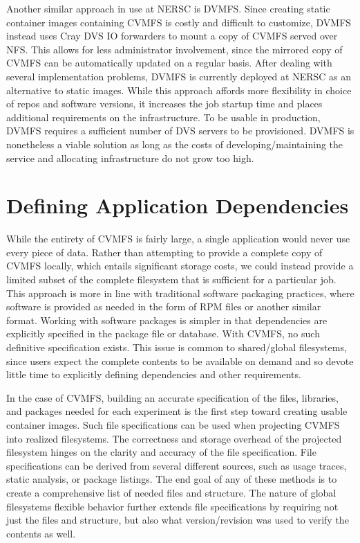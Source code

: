 \documentclass[conference]{IEEEtran}
\begin{document}
Another similar approach in use at NERSC is DVMFS.
Since creating static container images containing CVMFS is costly and difficult to customize,
DVMFS instead uses Cray DVS IO forwarders to mount a copy of CVMFS served over NFS.
This allows for less administrator involvement,
since the mirrored copy of CVMFS can be automatically updated on a regular basis.
After dealing with several implementation problems,
DVMFS is currently deployed at NERSC as an alternative to static images.
While this approach affords more flexibility in choice of repos and software versions,
it increases the job startup time and places additional requirements on the infrastructure.
To be usable in production, DVMFS requires a sufficient number of DVS servers to be provisioned.
DVMFS is nonetheless a viable solution as long as the costs of developing/maintaining the service and allocating infrastructure do not grow too high.

\section{Defining Application Dependencies}

While the entirety of CVMFS is fairly large,
a single application would never use every piece of data.
Rather than attempting to provide a complete copy of CVMFS locally,
which entails significant storage costs,
we could instead provide a limited subset of the complete filesystem that is sufficient for a particular job.
This approach is more in line with traditional software packaging practices,
where software is provided as needed in the form of RPM files or another similar format.
Working with software packages is simpler in that dependencies are explicitly specified in the package file or database.
With CVMFS, no such definitive specification exists.
This issue is common to shared/global filesystems,
since users expect the complete contents to be available on demand and so devote little time to explicitly defining dependencies and other requirements.

In the case of CVMFS,
building an accurate 
specification of the files, libraries, and packages
needed for each experiment is the first step toward creating usable container images.
Such file specifications can be used when 
projecting CVMFS into realized filesystems.
The correctness and storage overhead of the projected filesystem hinges on the clarity and accuracy of the file specification.
File specifications can be derived from several
different sources, such as 
usage traces, static analysis, or package listings.
The end goal of any of these methods is to 
create a comprehensive list of needed files and structure.
The nature of global filesystems flexible behavior
further extends file specifications by requiring
not just the files and structure, but also what
version/revision was used to verify the contents as well.
\end{document}
